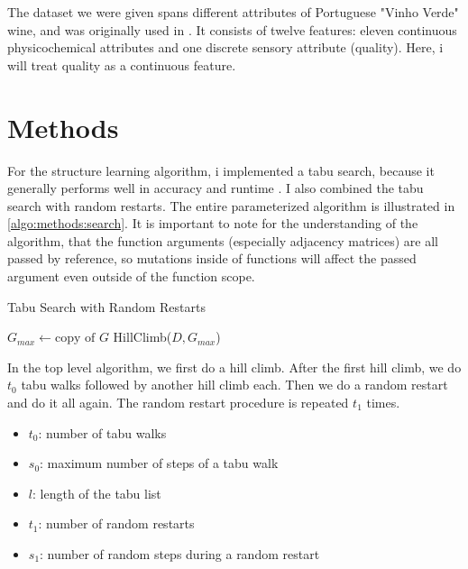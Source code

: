 \documentclass[sigconf, fleqn, prologue, dvipsnames]{acmart}
\newcommand{\maybe}[1]{%
	\textcolor{Goldenrod}{#1?}%
    \reversemarginpar%
    \marginpar{\raggedleft\textcolor{Goldenrod}{\rule{2mm}{2mm}}}%
}
\begin{document}
The dataset we were given spans different attributes of Portuguese "Vinho Verde" wine, and was originally used in \cite{Cortez2009}.
It consists of twelve features: eleven continuous physicochemical attributes and one discrete sensory attribute (quality).
Here, i will treat quality as a continuous feature.



\section{Methods}
For the structure learning algorithm, i implemented a tabu search, because it generally performs well in accuracy and runtime \cite{Scutari2019}.
I also combined the tabu search with random restarts. The entire parameterized algorithm is illustrated in \autoref{algo:methods:search}.
It is important to note for the understanding of the algorithm, that the function arguments (especially adjacency matrices) are all passed by reference, so mutations inside of functions will affect the passed argument even outside of the function scope.

\begin{algorithm}
	\caption{Tabu Search with Random Restarts}
	\label{algo:methods:search}

	$G_{max} \gets \text{copy of } G$\;
	HillClimb($D, G_{max}$)\;
\end{algorithm}

In the top level algorithm, we first do a hill climb. After the first hill climb, we do $t_0$ tabu walks followed by another hill climb each.
Then we do a random restart and do it all again. The random restart procedure is repeated $t_1$ times.
\begin{itemize}
	\item $t_0$: number of tabu walks
	\item $s_0$: maximum number of steps of a tabu walk
	\item $l$: length of the tabu list
	\item $t_1$: number of random restarts
	\item $s_1$: number of random steps during a random restart
\end{itemize}
\end{document}
